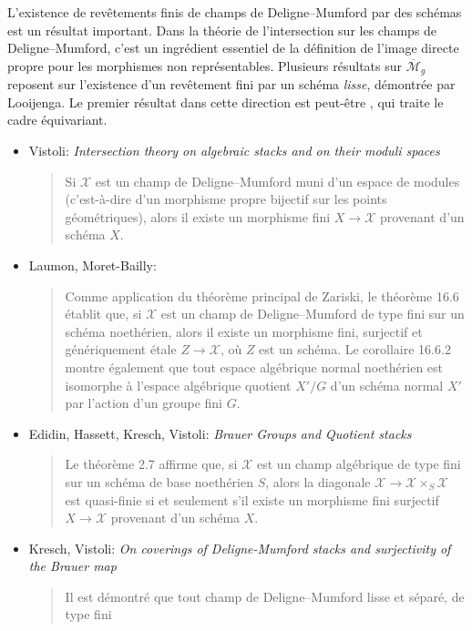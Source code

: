 \noindent
L'existence de revêtements finis de champs de Deligne--Mumford par des schémas
est un résultat important. Dans la théorie de l'intersection sur les champs de
Deligne--Mumford, c'est un ingrédient essentiel de la définition de l'image directe
propre pour les morphismes non représentables. Plusieurs
résultats sur $\overline{\mathcal{M}}_g$ reposent sur l'existence d'un revêtement
fini par un schéma \emph{lisse}, démontrée par Looijenga. Le premier résultat dans
cette direction est peut-être \cite[théorème 6.1]{seshadri_quotients},
qui traite le cadre équivariant.
\begin{itemize}
\item Vistoli: \emph{Intersection theory on algebraic stacks and on their
moduli spaces} \cite{vistoli_intersection}
\begin{quote}
Si $\mathcal{X}$ est un champ de Deligne--Mumford muni d'un espace de modules
(c'est-à-dire d'un morphisme propre
bijectif sur les points géométriques), alors il existe un morphisme fini
$X \to \mathcal{X}$ provenant d'un schéma $X$.
\end{quote}
\item Laumon, Moret-Bailly: \cite[chapitre 16]{LM-B}
\begin{quote}
Comme application du théorème principal de Zariski, le théorème 16.6 établit que,
si $\mathcal{X}$ est un champ de Deligne--Mumford de type fini sur un schéma
noethérien, alors
il existe un morphisme fini, surjectif et génériquement étale $Z \to
\mathcal{X}$,
où $Z$ est un schéma. Le corollaire 16.6.2 montre également que tout espace
algébrique normal noethérien est isomorphe à l'espace algébrique quotient $X'/G$
d'un schéma normal $X'$ par l'action d'un groupe fini $G$.
\end{quote}
\item Edidin, Hassett, Kresch, Vistoli:
\emph{Brauer Groups and Quotient stacks} \cite{ehkv}
\begin{quote}
Le théorème 2.7 affirme que,
si $\mathcal{X}$ est un champ algébrique de type fini sur un
schéma de base noethérien $S$, alors la diagonale
$\mathcal{X} \to \mathcal{X} \times_S \mathcal{X}$ est
quasi-finie si et seulement s'il existe un morphisme fini surjectif
$X \to \mathcal{X}$ provenant d'un schéma $X$.
\end{quote}
\item Kresch, Vistoli: \emph{On coverings of Deligne-Mumford stacks and
surjectivity of the Brauer map} \cite{kresch-vistoli}
\begin{quote}
Il est démontré que tout champ de Deligne--Mumford lisse et séparé, de type fini

\end{quote}
\end{itemize}
